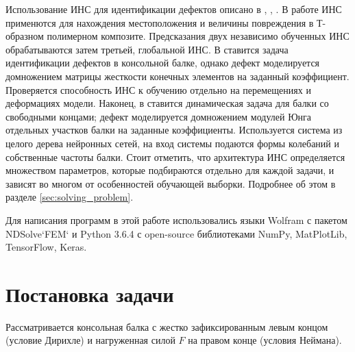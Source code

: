 \documentclass[a4paper,12pt]{article}
\theoremstyle{remark}
\begin{document}
	Использование ИНС для идентификации дефектов описано в \cite{artificial_neural_networks_in_damage_detection}, \cite{randomized_trained_neural_networks}, \cite{multi_stage_neural_networks}. В работе \cite{artificial_neural_networks_in_damage_detection} ИНС применются для нахождения местоположения и величины повреждения в Т-образном полимерном композите. Предсказания двух независимо обученных ИНС обрабатываются затем третьей, глобальной ИНС. В \cite{randomized_trained_neural_networks} ставится задача идентификации дефектов в консольной балке, однако дефект моделируется домножением матрицы жесткости конечных элементов на заданный коэффициент. Проверяется способность ИНС к обучению отдельно на перемещениях и деформациях модели. Наконец, в \cite{multi_stage_neural_networks} ставится динамическая задача для балки со свободными концами; дефект моделируется домножением модулей Юнга отдельных участков балки на заданные коэффициенты. Используется система из целого дерева нейронных сетей, на вход системы подаются формы колебаний и собственные частоты балки. Стоит отметить, что архитектура ИНС определяется множеством параметров, которые подбираются отдельно для каждой задачи, и зависят во многом от особенностей обучающей выборки. Подробнее об этом в разделе \ref{sec:solving_problem}.
	
	Для написания программ в этой работе использовались языки Wolfram с пакетом NDSolve`FEM` и Python 3.6.4 с open-source библиотеками NumPy, MatPlotLib, TensorFlow, Keras.
	
	\newpage
	\section{Постановка задачи}
	\label{sec:formulation_problem}
	
	Рассматривается консольная балка с жестко зафиксированным левым концом (условие Дирихле) и нагруженная силой $F$ на правом конце (условия Неймана).
\end{document}
